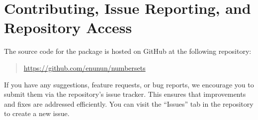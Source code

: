 \documentclass{l3doc}
\begin{document}
\section{Contributing, Issue Reporting, and Repository Access}

The source code for the \ThisPackageName{} package is hosted on GitHub at the following repository:
\begin{quote}
	\url{https://github.com/enunun/numbersets}
\end{quote}

If you have any suggestions, feature requests, or bug reports,
we encourage you to submit them via the repository's issue tracker.
This ensures that improvements and fixes are addressed efficiently. You can visit the ``Issues'' tab in the repository to create a new issue.

\printindex
\end{document}
